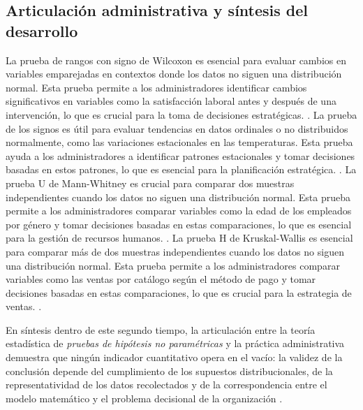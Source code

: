 {\subsection{Articulación administrativa y síntesis del desarrollo}
La prueba de rangos con signo de Wilcoxon es esencial para evaluar cambios en variables emparejadas en contextos donde los datos no siguen una distribución normal. Esta prueba permite a los administradores identificar cambios significativos en variables como la satisfacción laboral antes y después de una intervención, lo que es crucial para la toma de decisiones estratégicas. \citep{holmesBusiness2023,nistHandbook}.
La prueba de los signos es útil para evaluar tendencias en datos ordinales o no distribuidos normalmente, como las variaciones estacionales en las temperaturas. Esta prueba ayuda a los administradores a identificar patrones estacionales y tomar decisiones basadas en estos patrones, lo que es esencial para la planificación estratégica. \citep{holmesBusiness2023,nistHandbook}.
La prueba U de Mann-Whitney es crucial para comparar dos muestras independientes cuando los datos no siguen una distribución normal. Esta prueba permite a los administradores comparar variables como la edad de los empleados por género y tomar decisiones basadas en estas comparaciones, lo que es esencial para la gestión de recursos humanos. \citep{holmesBusiness2023,nistHandbook}.
La prueba H de Kruskal-Wallis es esencial para comparar más de dos muestras independientes cuando los datos no siguen una distribución normal. Esta prueba permite a los administradores comparar variables como las ventas por catálogo según el método de pago y tomar decisiones basadas en estas comparaciones, lo que es crucial para la estrategia de ventas. \citep{holmesBusiness2023,nistHandbook}.

En síntesis dentro de este segundo tiempo, la articulación entre la teoría estadística de \textit{pruebas de hipótesis no paramétricas} y la práctica administrativa demuestra que ningún indicador cuantitativo opera en el vacío: la validez de la conclusión depende del cumplimiento de los supuestos distribucionales, de la representatividad de los datos recolectados y de la correspondencia entre el modelo matemático y el problema decisional de la organización \citep{anderson2012,nistHandbook,guarin2002}.

\clearpage
}
